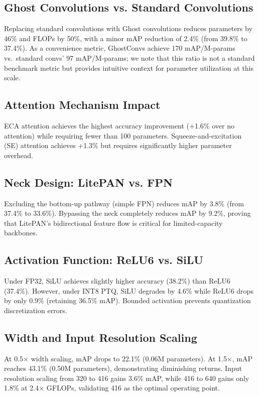 \documentclass[conference]{IEEEtran}
\begin{document}
\subsection{Ghost Convolutions vs. Standard Convolutions}
Replacing standard convolutions with Ghost convolutions reduces parameters by 46\% and FLOPs by 50\%, with a minor mAP reduction of 2.4\% (from 39.8\% to 37.4\%). As a convenience metric, GhostConvs achieve 170 mAP/M-params vs.\ standard convs' 97 mAP/M-params; we note that this ratio is not a standard benchmark metric but provides intuitive context for parameter utilization at this scale.

\subsection{Attention Mechanism Impact}
ECA attention achieves the highest accuracy improvement (+1.6\% over no attention) while requiring fewer than 100 parameters. Squeeze-and-excitation (SE) attention achieves +1.3\% but requires significantly higher parameter overhead.

\subsection{Neck Design: LitePAN vs. FPN}
Excluding the bottom-up pathway (simple FPN) reduces mAP by 3.8\% (from 37.4\% to 33.6\%). Bypassing the neck completely reduces mAP by 9.2\%, proving that LitePAN's bidirectional feature flow is critical for limited-capacity backbones.

\subsection{Activation Function: ReLU6 vs. SiLU}
Under FP32, SiLU achieves slightly higher accuracy (38.2\%) than ReLU6 (37.4\%). However, under INT8 PTQ, SiLU degrades by 4.6\% while ReLU6 drops by only 0.9\% (retaining 36.5\% mAP). Bounded activation prevents quantization discretization errors.

\subsection{Width and Input Resolution Scaling}
At 0.5$\times$ width scaling, mAP drops to 22.1\% (0.06M parameters). At 1.5$\times$, mAP reaches 43.1\% (0.50M parameters), demonstrating diminishing returns. Input resolution scaling from 320 to 416 gains 3.6\% mAP, while 416 to 640 gains only 1.8\% at 2.4$\times$ GFLOPs, validating 416 as the optimal operating point.
\end{document}
